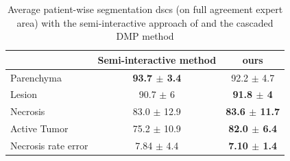 \begin{table}[ht!]
\caption{Average patient-wise segmentation \ac{dsc}s (on full agreement expert area) with the semi-interactive approach of \cite{Conze2017} and the cascaded DMP method}
\begin{tabular}{lcc}
\hline
& Semi-interactive method \cite{Conze2017} & ours \\
\hline
Parenchyma & \textbf{93.7 $\pm$ 3.4} & 92.2 $\pm$ 4.7 \\
Lesion & 90.7 $\pm$ 6 & \textbf{91.8 $\pm$ 4} \\
Necrosis & 83.0 $\pm$ 12.9 & \textbf{83.6 $\pm$ 11.7} \\
Active Tumor & 75.2 $\pm$ 10.9 & \textbf{82.0 $\pm$ 6.4} \\
Necrosis rate error & 7.84 $\pm$ 4.4 & \textbf{7.10 $\pm$ 1.4} \\
\hline
\end{tabular}
\label{ComparisionConze}
\end{table}

